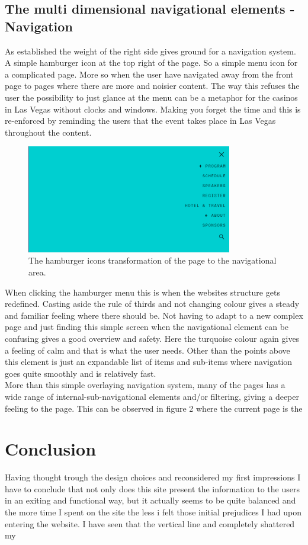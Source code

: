 \documentclass{article}
\begin{document}
        \subsection{The multi dimensional navigational elements -Navigation}
        As established the weight of the right side gives ground for a navigation system. A simple hamburger icon at the top right of the page. So a simple menu icon for a complicated page. More so when the user have navigated away from the front page to pages where there are more and noisier content. The way this refuses the user the possibility to just glance at the menu can be a metaphor for the casinos in Las Vegas without clocks and windows. Making you forget the time and this is re-enforced by reminding the users that the event takes place in Las Vegas throughout the content.
        \begin{figure}[!h]
            \centering
            \includegraphics[width=0.8\textwidth]{NavMenu}
            \caption{The hamburger icons transformation of the page to the navigational area.}
        \end{figure}
        When clicking the hamburger menu this is when the websites structure gets redefined. Casting aside the rule of thirds and not changing colour gives a steady and familiar feeling where there should be. Not having to adapt to a new complex page and just finding this simple screen when the navigational element can be confusing gives a good overview and safety. Here the turquoise colour again gives a feeling of calm and that is what the user needs. Other than the points above this element is just an expandable list of items and sub-items where navigation goes quite smoothly and is relatively fast.\\
        More than this simple overlaying navigation system, many of the pages has a wide range of internal-sub-navigational elements and/or filtering, giving a deeper feeling to the page. This can be observed in figure 2 where the current page is the 
    \section{Conclusion}
    Having thought trough the design choices and reconsidered my first impressions I have to conclude that not only does this site present the information to the users in an exiting and functional way, but it actually seems to be quite balanced and the more time I spent on the site the less i felt those initial prejudices I had upon entering the website. I have seen that the vertical line and   completely shattered my 
    
    
    
        
    
\end{document}
